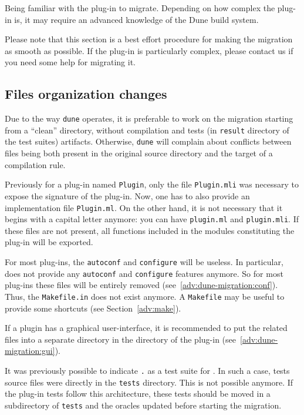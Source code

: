 \begin{prereq}
  Being familiar with the plug-in to migrate. Depending on how complex the
  plug-in is, it may require an advanced knowledge of the Dune build system.
\end{prereq}

Please note that this section is a best effort procedure for making the
migration as smooth as possible. If the plug-in is particularly complex,
please contact us if you need some help for migrating it.

\subsection{Files organization changes}

\begin{important}
Due to the way \texttt{dune} operates, it is preferable to work on the migration
starting from a ``clean'' directory, without compilation and tests
(in \texttt{result} directory of the test suites) artifacts. Otherwise,
\texttt{dune} will complain about conflicts between files being both present
in the original source directory and the target of a compilation rule.
\end{important}

Previously for a plug-in named \texttt{Plugin}, only the file
\texttt{Plugin.mli} was necessary to expose the signature of the plug-in. Now,
one has to also provide an implementation file \texttt{Plugin.ml}.
On the other hand, it is not necessary that it begins with a capital letter
anymore: you can have \texttt{plugin.ml} and \texttt{plugin.mli}. If these files
are not present, all functions included in the modules constituting the
plug-in will be exported.

For most plug-ins, the \texttt{autoconf} and \texttt{configure} will be useless.
In particular, \framac does not provide any \texttt{autoconf} and
\texttt{configure} features anymore. So for most plug-ins these files will be
entirely removed (see~\ref{adv:dune-migration:conf}). Thus, the
\texttt{Makefile.in} does not exist anymore. A \texttt{Makefile} may be useful
to provide some shortcuts (see Section~\ref{adv:make}).

If a plugin has a graphical user-interface, it is recommended to put the related
files into a separate directory in the directory of the plug-in
(see~\ref{adv:dune-migration:gui}).

It was previously possible to indicate \texttt{.} as a test suite for \ptests.
In such a case, tests source files were directly in the \texttt{tests} directory.
This is not possible anymore. If the plug-in tests follow this architecture,
these tests should be moved in a subdirectory of \texttt{tests} and the oracles
updated before starting the migration.

